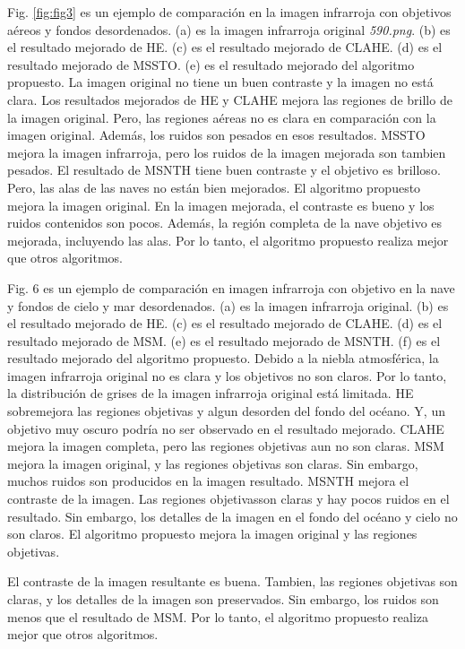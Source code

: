 \documentclass[a4paper, 11 pt, conference]{ieeeconf}      %
\begin{document}
Fig. \eqref{fig:fig3} es un ejemplo de comparaci\'on en la imagen infrarroja con objetivos a\'ereos y fondos desordenados. (a) es la imagen infrarroja original \textit{590.png}. (b) es el resultado mejorado de HE. (c) es el resultado mejorado de CLAHE. (d) es el resultado mejorado de MSSTO. (e) es el resultado mejorado del algoritmo propuesto. La imagen original no tiene un buen contraste y la imagen no est\'a clara. Los resultados mejorados de HE y CLAHE mejora las regiones de brillo de la imagen original. Pero, las regiones a\'ereas no es clara en comparaci\'on con la imagen original. Adem\'as, los ruidos son pesados en esos resultados. MSSTO mejora la imagen infrarroja, pero los ruidos de la imagen mejorada son tambien pesados. El resultado de MSNTH tiene buen  contraste y el objetivo es brilloso. Pero, las alas de las naves no est\'an bien mejorados. El algoritmo propuesto mejora la imagen original. En la imagen mejorada, el contraste es bueno y los ruidos contenidos son pocos. Adem\'as, la regi\'on completa de la nave objetivo es mejorada, incluyendo las alas. Por lo tanto, el algoritmo propuesto realiza mejor que otros algoritmos.

Fig. 6 es un ejemplo de comparaci\'on en imagen infrarroja con objetivo en la nave y fondos de cielo y mar desordenados. (a) es la imagen infrarroja original. (b) es el resultado mejorado de HE. (c) es el resultado mejorado de CLAHE. (d) es el resultado mejorado de MSM. (e) es el resultado mejorado de MSNTH. (f) es el resultado mejorado del algoritmo propuesto. Debido a la niebla atmosf\'erica, la imagen infrarroja original no es clara y los objetivos no son claros. Por lo tanto, la distribuci\'on de grises de la imagen infrarroja original est\'a limitada. HE sobremejora las regiones objetivas y algun desorden del fondo del oc\'eano. Y, un objetivo muy oscuro podr\'ia no ser observado en el resultado mejorado.  CLAHE mejora la imagen completa, pero las regiones objetivas aun no son claras. MSM mejora la imagen original, y las regiones objetivas son claras. Sin embargo, muchos ruidos son producidos en la imagen resultado. MSNTH mejora el contraste de la imagen. Las regiones objetivasson claras y hay pocos ruidos en el resultado. Sin embargo, los detalles de la imagen en el fondo del oc\'eano y cielo no son claros. El algoritmo propuesto mejora la imagen original y las regiones objetivas.

El contraste de la imagen resultante es buena. Tambien, las regiones objetivas son claras, y los detalles de la imagen son preservados. Sin embargo, los ruidos son menos que el resultado de MSM. Por lo tanto, el algoritmo propuesto realiza mejor que otros algoritmos.
\end{document}

